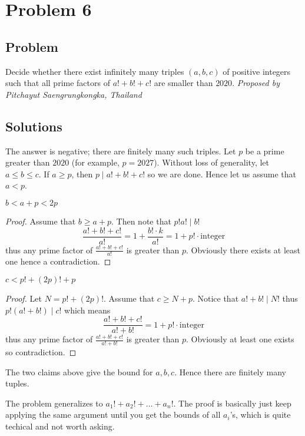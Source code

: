 \section{Problem 6}
\subsection{Problem}
Decide whether there exist infinitely many triples $(a,b,c)$ of positive integers such that all prime factors of $a!+b!+c!$ are smaller than $2020$.
\nl
\textit{Proposed by Pitchayut Saengrungkongka, Thailand}
\subsection{Solutions}
The answer is negative; there are finitely many such triples.
\nl Let $p$ be a prime greater than $2020$ (for example, $p=2027$). Without loss of generality, let $a\leq b\leq c$. If $a\geq p$, then $p\mid a!+b!+c!$ so we are done. Hence let us assume that $a<p$.
\begin{claim}
    $b<a+p<2p$
\end{claim}
\begin{proof}
    Assume that $b\geq a+p$. Then note that $p!a!\mid b!$
    $$\frac{a!+b!+c!}{a!}=1+\frac{b!\cdot k}{a!} = 1+p!\cdot\text{integer}$$
    thus any prime factor of $\tfrac{a!+b!+c!}{a!}$ is greater than $p$. Obviously there exists at least one hence a contradiction.
\end{proof}
\begin{claim}
    $c<p!+(2p)!+p$
\end{claim}
\begin{proof}
    Let $N = p!+(2p)!$. Assume that $c\geq N+p$. Notice that $a!+b!\mid N!$ thus $p!(a!+b!)\mid c!$ which means
    $$\frac{a!+b!+c!}{a!+b!} = 1+p!\cdot\text{integer}$$
    thus any prime factor of $\frac{a!+b!+c!}{a!+b!}$ is greater than $p$. Obviously at least one exists so contradiction.
\end{proof}
The two claims above give the bound for $a,b,c$. Hence there are finitely many tuples.
\begin{remark}
    The problem generalizes to $a_1!+a_2!+\hdots+a_n!$. The proof is basically just keep applying the same argument until you get the bounds of all $a_i$'s, which is quite techical and not worth asking.
\end{remark}
